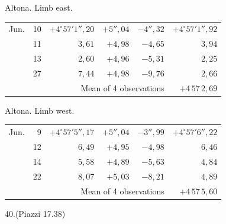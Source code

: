 \noindent\begin{minipage}[t]{.495\textwidth}\centering Altona. Limb east.\par\smallskip
{\scriptsize\setlength{\tabcolsep}{1pt}\renewcommand{\arraystretch}{1.2}\begin{tabular}{lr|r|r|r|r|}
Jun.&10&$+4^\circ57'1''{,}20$&$+5''{,}04$&$-4''{,}32$&$+4^\circ57'1''{,}92$\\
&11&$3{,}61$&$+4{,}98$&$-4{,}65$&$3{,}94$\\
&13&$2{,}60$&$+4{,}96$&$-5{,}31$&$2{,}25$\\
&27&$7{,}44$&$+4{,}98$&$-9{,}76$&$2{,}66$\\
\cline{6-6}\multicolumn{5}{r}{Mean of 4 observations}&$+4\,57\,2{,}69$
\end{tabular}}\end{minipage}\hfill\begin{minipage}[t]{.495\textwidth}\centering Altona. Limb west.\par\smallskip
{\scriptsize\setlength{\tabcolsep}{1pt}\renewcommand{\arraystretch}{1.2}\begin{tabular}{lr|r|r|r|r}
Jun.&9&$+4^\circ57'5''{,}17$&$+5''{,}04$&$-3''{,}99$&$+4^\circ57'6''{,}22$\\
&12&$6{,}49$&$+4{,}95$&$-4{,}98$&$6{,}46$\\
&14&$5{,}58$&$+4{,}89$&$-5{,}63$&$4{,}84$\\
&22&$8{,}07$&$+5{,}03$&$-8{,}21$&$4{,}89$\\
\cline{6-6}\multicolumn{5}{r}{\raisebox{.3ex}{.}\,Mean of 4 observations}&$+4\,57\,5{,}60$
\end{tabular}}\end{minipage}
\par\vspace{4mm}
\begin{center}40.\quad (Piazzi 17.38)\end{center}

